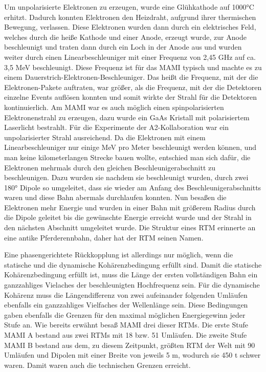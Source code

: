 \documentclass[a4paper,11pt,oneside,final,german,openbib,pdftex]{scrbook}
\begin{document}
{Um unpolarisierte Elektronen zu erzeugen, wurde eine Glühkathode auf 1000°C erhitzt. Dadurch konnten Elektronen den Heizdraht, aufgrund ihrer thermischen Bewegung, verlassen. Diese Elektronen wurden dann durch ein elektrisches Feld, welches durch die heiße Kathode und einer Anode, erzeugt wurde, zur Anode beschleunigt und traten dann durch ein Loch in der Anode aus und wurden weiter durch einen Linearbeschleuniger mit einer Frequenz von 2,45 GHz auf ca. 3,5 MeV beschleunigt. Diese Frequenz ist für das MAMI typisch und machte es zu einem Dauerstrich-Elektronen-Beschleuniger. Das heißt die Frequenz, mit der die Elektronen-Pakete auftraten, war größer, als die Frequenz, mit der die Detektoren einzelne Events auflösen konnten und somit wirkte der Strahl für die Detektoren kontinuierlich.
Am MAMI war es auch m\"oglich einen spinpolarisierten Elektronenstrahl zu erzeugen, dazu wurde ein GaAs Kristall mit polarisiertem Laserlicht bestrahlt. F\"ur die Experimente der A2-Kollaboration war ein unpolarisierter Strahl ausreichend.
\newline
Da die Elektronen mit einem Linearbeschleuniger nur einige MeV pro Meter beschleunigt werden k\"onnen, und man keine kilometerlangen Strecke bauen wollte, entschied man sich daf\"ur, die Elektronen mehrmals durch den gleichen Beschleunigerabschnitt zu beschleunigen. Dazu wurden sie nachdem sie beschleunigt wurden, durch zwei 180° Dipole so umgeleitet, dass sie wieder am Anfang des Beschleunigerabschnitts waren und diese Bahn abermals durchlaufen konnten. Nun besa{\ss}en die Elektronen mehr Energie und wurden in einer Bahn mit gr\"o{\ss}erem Radius durch die Dipole geleitet bis die gew\"unschte Energie erreicht wurde und der Strahl in den n\"achsten Abschnitt umgeleitet wurde. Die Struktur eines RTM erinnerte an eine antike Pferderennbahn, daher hat der RTM seinen Namen.

 Eine phasengerichtete R\"uckkopplung ist allerdings nur m\"oglich, wenn die statische und die dynamische Koh\"arenzbedingung erf\"ullt sind. Damit die statische Koh\"arenzbedingung erf\"ullt ist, muss die L\"ange der ersten vollst\"andigen Bahn ein ganzzahliges Vielaches der beschleunigten Hochfrequenz sein. F\"ur die dynamische Koh\"arenz muss die L\"angendifferenz von zwei aufeinander folgenden Uml\"aufen ebenfalls ein ganzzahliges Vielfaches der Wellenl\"ange sein\cite{Un08}. Diese Bedingungen gaben ebenfalls die Grenzen f\"ur den maximal m\"oglichen Energiegewinn jeder Stufe an. 
\newline
\newline
Wie bereits erw\"ahnt besa{\ss} MAMI drei dieser RTMs. Die erste Stufe MAMI A bestand aus zwei RTMs mit 18 bzw. 51 Uml\"aufen. Die zweite Stufe MAMI B bestand aus dem, zu diesem Zeitpunkt, gr\"o{\ss}ten RTM der Welt mit 90 Uml\"aufen und Dipolen mit einer Breite von jeweils 5 m, wodurch sie 450 t schwer waren. Damit waren auch die technischen Grenzen erreicht.\cite{KPh11F}


}
\end{document}
